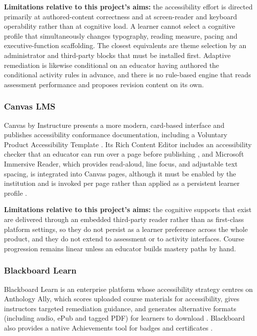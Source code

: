 \documentclass[12pt, oneside]{article} %
\begin{document}
\textbf{Limitations relative to this project's aims:} the accessibility effort is directed primarily at authored-content correctness and at screen-reader and keyboard operability rather than at cognitive load. A learner cannot select a cognitive profile that simultaneously changes typography, reading measure, pacing and executive-function scaffolding. The closest equivalents are theme selection by an administrator and third-party blocks that must be installed first. Adaptive remediation is likewise conditional on an educator having authored the conditional activity rules in advance, and there is no rule-based engine that reads assessment performance and proposes revision content on its own.

\subsubsection{Canvas LMS}
Canvas by Instructure presents a more modern, card-based interface and publishes accessibility conformance documentation, including a Voluntary Product Accessibility Template \cite{canvas_accessibility,canvas_lms}. Its Rich Content Editor includes an accessibility checker that an educator can run over a page before publishing \cite{canvas_a11y_checker}, and Microsoft Immersive Reader, which provides read-aloud, line focus, and adjustable text spacing, is integrated into Canvas pages, although it must be enabled by the institution and is invoked per page rather than applied as a persistent learner profile \cite{canvas_immersive_reader}.

\textbf{Limitations relative to this project's aims:} the cognitive supports that exist are delivered through an embedded third-party reader rather than as first-class platform settings, so they do not persist as a learner preference across the whole product, and they do not extend to assessment or to activity interfaces. Course progression remains linear unless an educator builds mastery paths by hand.

\subsubsection{Blackboard Learn}
Blackboard Learn is an enterprise platform whose accessibility strategy centres on Anthology Ally, which scores uploaded course materials for accessibility, gives instructors targeted remediation guidance, and generates alternative formats (including audio, ePub and tagged PDF) for learners to download \cite{blackboard_ally}. Blackboard also provides a native Achievements tool for badges and certificates \cite{blackboard_achievements}.
\end{document}
